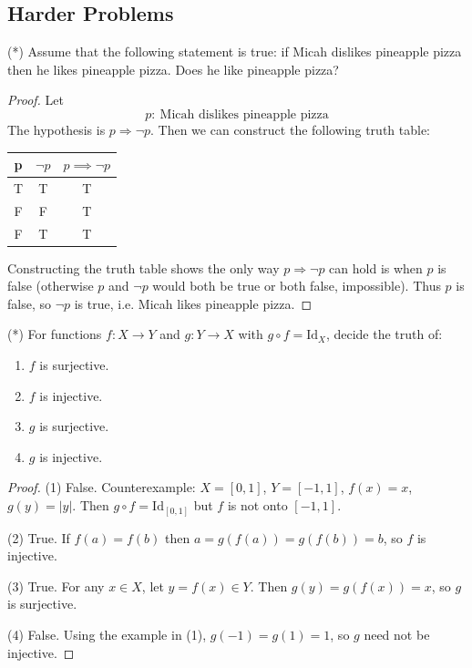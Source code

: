 \documentclass[12pt]{article}
\begin{document}
\subsection*{Harder Problems}

\begin{problem}
(*) Assume that the following statement is true: if Micah dislikes pineapple pizza then he likes pineapple pizza. Does he like pineapple pizza?

\begin{proof}
Let
\[
    p:\ \text{Micah dislikes pineapple pizza}
\]
The hypothesis is $p\Rightarrow \neg p$. Then we can construct the following truth table:
\begin{center}
    \begin{tabular}{c | c | c }
        p & $\lnot p$ & $p \implies \lnot p$ \\
        \hline
        T & T & T \\
        F & F & T \\
        F & T & T
    \end{tabular}
\end{center}


Constructing the truth table shows the only way $p\Rightarrow \neg p$ can hold is when $p$ is false (otherwise $p$ and $\neg p$ would both be true or both false, impossible). Thus $p$ is false, so $\neg p$ is true, i.e. Micah likes pineapple pizza.
\end{proof}
\end{problem}

\begin{problem}
(*) For functions $f:X\to Y$ and $g:Y\to X$ with $g\circ f=\mathrm{Id}_X$, decide the truth of:
\begin{enumerate}
\item $f$ is surjective.
\item $f$ is injective.
\item $g$ is surjective.
\item $g$ is injective.
\end{enumerate}

\begin{proof}
(1) False. Counterexample: $X=[0,1]$, $Y=[-1,1]$, $f(x)=x$, $g(y)=|y|$. Then $g\circ f=\mathrm{Id}_{[0,1]}$ but $f$ is not onto $[-1,1]$.

(2) True. If $f(a)=f(b)$ then $a=g(f(a))=g(f(b))=b$, so $f$ is injective.

(3) True. For any $x\in X$, let $y=f(x)\in Y$. Then $g(y)=g(f(x))=x$, so $g$ is surjective.

(4) False. Using the example in (1), $g(-1)=g(1)=1$, so $g$ need not be injective.
\end{proof}
\end{problem}
\end{document}
